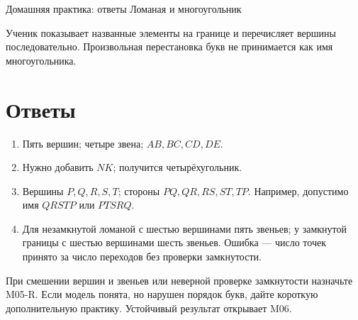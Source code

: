 \worksheettitle
  {Домашняя практика: ответы}
  { Ломаная и многоугольник}

\begin{teacherbox}[Критерии]
  Ученик показывает названные элементы на границе и перечисляет вершины
  последовательно. Произвольная перестановка букв не принимается как имя
  многоугольника.
\end{teacherbox}

\section{Ответы}

\begin{enumerate}
  \item Пять вершин; четыре звена; $AB,BC,CD,DE$.
  \item Нужно добавить $NK$; получится четырёхугольник.
  \item Вершины $P,Q,R,S,T$; стороны $PQ,QR,RS,ST,TP$.
    Например, допустимо имя $QRSTP$ или $PTSRQ$.
  \item Для незамкнутой ломаной с шестью вершинами пять звеньев; у замкнутой
    границы с шестью вершинами шесть звеньев. Ошибка --- число точек принято
    за число переходов без проверки замкнутости.
\end{enumerate}

\begin{resultbox}[Маршрут]
  При смешении вершин и звеньев или неверной проверке замкнутости назначьте
  M05-R. Если модель понята, но нарушен порядок букв, дайте короткую
  дополнительную практику. Устойчивый результат открывает M06.
\end{resultbox}
